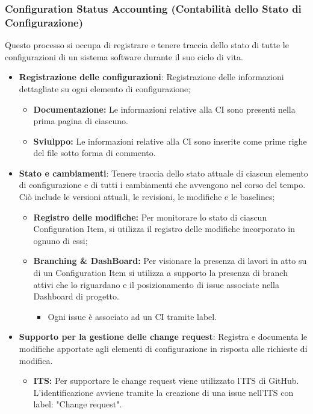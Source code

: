 \subsubsection{Configuration Status Accounting (Contabilità dello Stato di Configurazione)}
Questo processo si occupa di registrare e tenere traccia dello stato di tutte le configurazioni di un sistema software durante il suo ciclo di vita.
\begin{itemize}
    \item \textbf{Registrazione delle configurazioni}: Registrazione delle informazioni dettagliate su ogni elemento di configurazione;
          \begin{itemize}
              \item  \textbf{Documentazione:} Le informazioni relative alla CI sono presenti nella prima pagina di ciascuno.
              \item  \textbf{Sviulppo:} Le informazioni relative alla CI sono inserite come prime righe del file sotto forma di commento.
          \end{itemize}
    \item \textbf{Stato e cambiamenti}: Tenere traccia dello stato attuale di ciascun elemento di configurazione e di tutti i cambiamenti che avvengono nel corso del tempo. \\
    Ciò include le versioni attuali, le revisioni, le modifiche e le baselines;
          \begin{itemize}
              \item  \textbf{Registro delle modifiche:} Per monitorare lo stato di ciascun Configuration Item, si utilizza il registro delle modifiche incorporato in ognuno di essi; 
              \item  \textbf{Branching \& DashBoard:} Per visionare la presenza di lavori in atto su di un Configuration Item si utilizza a supporto la presenza di branch attivi che lo riguardano e il posizionamento di issue associate nella Dashboard di progetto. 
                    \begin{itemize}
                        \item Ogni issue è associato ad un CI tramite label.  \label{sec:ticketing}
                    \end{itemize}
          \end{itemize}
    \item \textbf{Supporto per la gestione delle change request}: Registra e documenta le modifiche apportate agli elementi di configurazione in risposta alle richieste di modifica.
          \begin{itemize}
              \item  \textbf{ITS:} Per supportare le change request viene utilizzato l'ITS di GitHub. L'identificazione avviene tramite la creazione di una issue nell'ITS con label: "Change request".
          \end{itemize}
\end{itemize}

